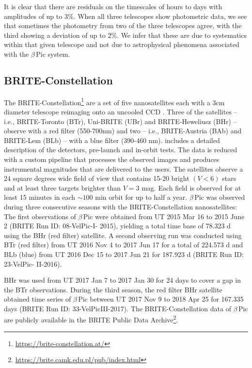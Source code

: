 \documentclass[longauth]{aa} %
\newcommand{\bp}{$\beta$\,Pic}
\begin{document}
It is clear that there are residuals on the timescales of hours to days with amplitudes of up to 3\%.
%
When all three telescopes show photometric data, we see that sometimes the photometry from two of the three telescopes agree, with the third showing a deviation of up to 2\%.
%
We infer that these are due to systematics within that given telescope and not due to astrophysical phenomena associated with the \bp{} system.

\subsection{BRITE-Constellation}

The BRITE-Constellation\footnote{\url{https://brite-constellation.at/}} are a set of five nanosatellites each with a 3cm diameter telescope reimaging onto an uncooled CCD \citep{Weiss14}.
%
Three of the satellites -- i.e., BRITE-Toronto (BTr), Uni-BRITE (UBr) and BRITE-Heweliusz (BHr) -- observe with a red filter (550-700nm) and two -- i.e., BRITE-Austria (BAb) and BRITE-Lem (BLb) --  with a blue filter (390-460 nm). \citet{pablo2016} includes a detailed description of the detectors, pre-launch and in-orbit tests.
The data is reduced with a custom pipeline \citep{Popowicz17} that processes the observed images and produces instrumental magnitudes that are delivered to the users.
%
The satellites observe a 24 square degrees wide field of view that contains 15-20 bright $(V<6)$ stars and at least three targets brighter than $V=3$ mag. Each field is observed for at least 15 minutes in each $\sim 100$ min orbit for up to half a year.
%
\bp{} was observed during three consecutive seasons with the BRITE-Constellation nanosatellites:
The first observations of \bp{} were obtained
from UT 2015 Mar 16 to 2015 June 2 (BRITE Run ID: 08-VelPic-I-
2015), yielding a total time base of 78.323 d using the BHr (red filter) satellite.
%
A second observing run was conducted using BTr (red filter) from
UT 2016 Nov 4 to 2017 Jun 17
for a total of 224.573 d and BLb (blue) from
UT 2016 Dec 15 to 2017 Jun 21 for 187.923 d
(BRITE Run ID: 23-VelPic- II-2016).

BHr was used from UT 2017 Jan 7 to 2017 Jan 30
for 24 days to cover a gap in the BTr observations.
%
During the third season, the red filter BHr satellite obtained time series of \bp{} between
UT 2017 Nov 9 to 2018 Apr 25 for 167.335 days
(BRITE Run ID: 33-VelPicIII-2017).
%
The BRITE-Constellation data of \bp{} are publicly available in the BRITE Public Data Archive\footnote{\url{https://brite.camk.edu.pl/pub/index.html}}.
%
\end{document}
